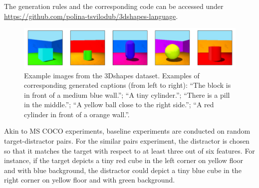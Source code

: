 The generation rules and the corresponding code can be accessed under \url{https://github.com/polina-tsvilodub/3dshapes-language}.

\begin{figure}
	\centering
	\includegraphics[width=\linewidth]{images/3dshapes_example.png}
	\caption{Example images from the 3Dshapes dataset. Examples of corresponding generated captions (from left to right): ``The block is in front of a medium blue wall.''; ``A tiny cylinder.''; ``There is a pill in the middle.''; ``A yellow ball close to the right side.''; ``A red cylinder in front of a orange wall.''.}
	\label{fig:3dshapes_example_short}
\end{figure} 

Akin to MS COCO experiments, baseline experiments are conducted on random target-distractor pairs. For the similar pairs experiment, the distractor is chosen so that it matches the target with respect to at least three out of six features. For instance, if the target depicts a tiny red cube in the left corner on yellow floor and with blue background, the distractor could depict a tiny blue cube in the right corner on yellow floor and with green background.



